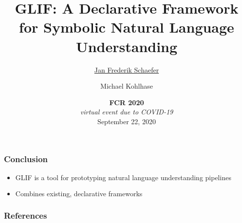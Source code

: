 \documentclass{beamer}
\title{GLIF: A Declarative Framework for Symbolic Natural Language Understanding}
\author{\underline{Jan Frederik Schaefer} \and Michael Kohlhase}
\institute{FAU Erlangen-N\"urnberg}
\date{\textbf{FCR 2020} \\ \textit{virtual event due to COVID-19} \\ September 22, 2020 }
\begin{document}
\frame\titlepage














\begin{frame}
    \frametitle{Conclusion}
    \begin{itemize}
        \item GLIF is a tool for prototyping natural language understanding pipelines
        \item Combines existing, declarative frameworks
    \end{itemize}

    \vspace{2em}
    
\end{frame}

\appendix

\begin{frame}[allowframebreaks,t]
    \frametitle{References}
    \printbibliography
\end{frame}
\end{document}
